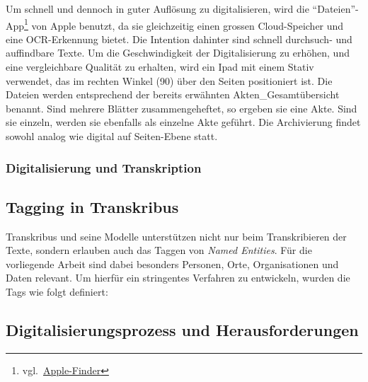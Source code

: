 \documentclass[12pt, a4paper, ngerman, bidi=default]{article}
\begin{document}
    Um schnell und dennoch in guter Auflösung zu digitalisieren, wird die \enquote{Dateien}-App\footnote{vgl.~\href{https://support.apple.com/de-de/guide/preview/prvw28034/mac}{Apple-Finder}} von 
    Apple benutzt, da sie gleichzeitig einen grossen Cloud-Speicher und eine OCR-Erkennung bietet. Die Intention dahinter sind schnell durchsuch- und auffindbare Texte.
    Um die Geschwindigkeit der Digitalisierung zu erhöhen, und eine vergleichbare Qualität zu erhalten, wird ein Ipad mit einem Stativ verwendet, das im rechten Winkel (90\textdegree) über den Seiten positioniert ist. 
    Die Dateien werden entsprechend der bereits erwähnten Akten\_Gesamtübersicht benannt. Sind mehrere Blätter zusammengeheftet, so ergeben sie eine Akte. Sind sie einzeln, werden sie ebenfalls als einzelne Akte geführt. Die Archivierung findet sowohl analog wie digital auf Seiten-Ebene statt.\\
  
    \subsubsection{Digitalisierung und Transkription}
    
    \subsection{Tagging in Transkribus} 

    Transkribus und seine Modelle unterstützen nicht nur beim Transkribieren der Texte, sondern erlauben auch das Taggen von \textit{Named Entities}.  
    Für die vorliegende Arbeit sind dabei besonders Personen, Orte, Organisationen und Daten relevant.  
    Um hierfür ein stringentes Verfahren zu entwickeln, wurden die Tags wie folgt definiert:
    

\subsection{Digitalisierungsprozess und Herausforderungen}
\end{document}
